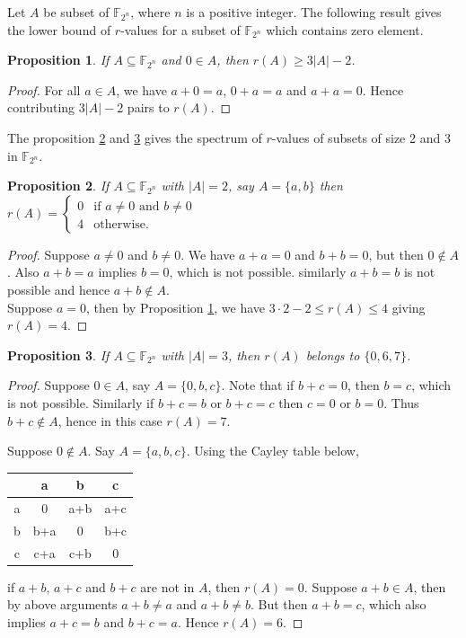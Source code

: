 \documentclass[12pt,a4paper]{article}
\newtheorem{prop}{Proposition}[section]
\begin{document}
	Let $A$ be subset of $\mathbb{F}_{2^n}$, where $n$ is a positive integer.
	The following result gives the lower bound of $r$-values for a subset of $\mathbb{F}_{2^n}$ which contains zero element. 
	\begin{prop}\label{bound}
		If $A\subseteq \mathbb{F}_{2^n}$ and $0\in A$, then $r(A)\geq 3|A|-2$.
		
	\end{prop}
	\begin{proof}
		For all $a\in A$, we have $a+0=a$, $0+a=a$ and $a+a=0$. Hence contributing $3|A|-2$ pairs to $r(A)$.
	\end{proof}
	The proposition \ref{size 2} and \ref{3_subsset} gives the spectrum of $r$-values of subsets of size 2 and 3 in $\mathbb{F}_{2^n}$.
	\begin{prop}\label{size 2}
		If $A\subseteq \mathbb{F}_{2^n}$ with $|A|=2$, say $A=\{a,b\}$ then $r(A)=\begin{cases}
			0 & \text{if } a\neq 0\text{ and }b\neq 0\\
			4& \text{otherwise.}
		\end{cases}$
	\end{prop}
	\begin{proof}
		Suppose $a\neq 0$ and $b\neq 0$. We have $a+a=0$ and $b+b=0$, but then $0\not\in A$. Also $a+b=a$ implies $b=0$, which is not possible. similarly $a+b=b$ is not possible and hence $a+b\not\in A$.\\
		Suppose $a=0$, then by Proposition \ref{bound}, we have $3\cdot2-2\leq r(A)\leq 4$ giving $r(A)=4$.
	\end{proof}
	\begin{prop}\label{3_subsset}
		If $A\subseteq \mathbb{F}_{2^n}$ with $|A|=3$, then $r(A)$ belongs to $\{0,6,7\}$.
	\end{prop}
	\begin{proof}
		Suppose $0\in A$, say $A=\{0,b,c\}$. Note that if $b+c=0$, then $b=c$, which is not possible. Similarly if $b+c=b$ or $b+c=c$ then $c=0$ or $b=0$. Thus $b+c\notin A$, hence in this case $r(A)=7$.
		
		Suppose $0\notin A$. Say $A=\{a,b,c\}$. Using the Cayley table below,\\
		\begin{center}
			\begin{tabular}{c||c|c|c}
				& a & b & c \\
				\hline
				\hline
				a & 0 & a+b & a+c \\
				\hline
				b & b+a & 0 & b+c \\
				\hline
				c & c+a & c+b & 0 \\
			\end{tabular}
		\end{center}
		
		if $a+b$, $a+c$ and $b+c$ are not in $A$, then $r(A)=0$. Suppose $a+b\in A$, then by above arguments $a+b\neq a$ and $a+b\neq b$. But then $a+b=c$, which also implies $a+c=b$ and $b+c=a$. Hence $r(A)=6$.
	\end{proof}
\end{document}
